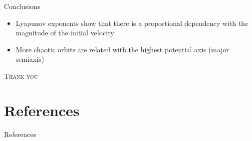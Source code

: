 \documentclass[handout]{beamer}
\begin{document}
\begin{frame}{Conclusions}
	\begin{itemize}
		\item Lyapunov exponents show that there is a proportional dependency with the magnitude of the initial velocity
		\item More chaotic orbits are related with the highest potential axis (major semiaxis)
	\end{itemize}
\end{frame}

\begin{frame}
	\centering
	\Huge
	\scshape
	Thank you
\end{frame}

\section{References}
\begin{frame}{References}
	\nocite{*}
	\printbibliography
\end{frame}
\end{document}
